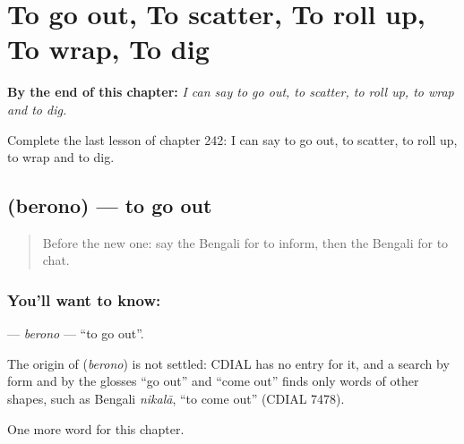 
\chapter{To go out, To scatter, To roll up, To wrap, To dig}
\label{ch:bn-to-go-out-to-scatter-to-roll-up-to-wrap-to-dig}

\begin{chapteropening}
\textbf{By the end of this chapter:} \emph{I can say to go out, to scatter, to roll up, to wrap and to dig.}

Complete the last lesson of chapter 242: I can say to go out, to scatter, to roll up, to wrap and to dig.
\end{chapteropening}

\section[\texorpdfstring{\bn{বেরোনো} (berono)}{বেরোনো (berono)}]{ (berono) — to go out}

\label{lesson:BN-C242-berono}



\begin{quote}
Before the new one: say the Bengali for to inform, then the Bengali for to chat.
\end{quote}

\subsection*{You'll want to know: }
\textbf{} — \emph{berono} — \textquotedblleft{}to go out\textquotedblright{}.

\begin{cousinweb}
The origin of \textbf{} (\emph{berono}) is not settled: CDIAL has no entry for it, and a search by form and by the glosses \textquotedblleft{}go out\textquotedblright{} and \textquotedblleft{}come out\textquotedblright{} finds only words of other shapes, such as Bengali \emph{nikalā}, \textquotedblleft{}to come out\textquotedblright{} (CDIAL 7478).
\end{cousinweb}

\begin{grammarlens}[title={What you've built}]
One more word for this chapter.
\end{grammarlens}

